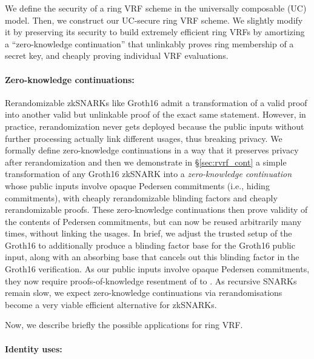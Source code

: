 We define the security of a ring VRF scheme in the universally composable (UC) \cite{canetti1,canetti2} model. Then, we construct our UC-secure ring VRF scheme. We slightly modify it by preserving its security to build extremely efficient 
ring VRFs by amortizing a ``zero-knowledge continuation'' that unlinkably
proves ring membership of a secret key, and  cheaply proving
individual VRF evaluations.


\paragraph{Zero-knowledge continuations:}

Rerandomizable zkSNARKs like Groth16 \cite{Groth16} admit a
transformation of a valid proof into another valid but unlinkable
proof of the exact same statement.  However, in practice, rerandomization
never gets deployed because the public inputs without further processing actually 
link different usages, thus breaking privacy.
We formally define zero-knowledge continuations in a way that it preserves privacy after rerandomization and then  we demonstrate in \S\ref{sec:rvrf_cont} a simple transformation of
any Groth16 zkSNARK into a {\it zero-knowledge continuation} whose
public inputs involve opaque Pedersen commitments (i.e., hiding commitments), with cheaply
rerandomizable blinding factors and cheaply rerandomizable proofs.
These zero-knowledge continuations then prove validity of the contents
of Pedersen commitments, but can now be reused arbitrarily many times,
without linking the usages.
In brief, we adjust the trusted setup of the Groth16 to additionally
produce a blinding factor base for the Groth16 public input, 
along with an absorbing base that cancels out this blinding factor in the
Groth16 verification.
As our public inputs involve opaque Pedersen commitments,
they now require proofs-of-knowledge resentment of to \cite{LegoSNARK}. 
As recursive SNARKs remain slow,
we expect zero-knowledge continuations via rerandomisations become a very viable efficient alternative for zkSNARKs.

Now, we describe briefly the possible applications for ring VRF.
\paragraph{Identity uses:}

